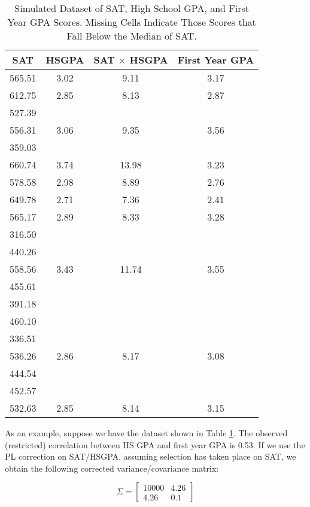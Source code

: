 \documentclass[man, babel,english]{apa}%
\begin{document}
\begin{table}[ht]
\caption{Simulated Dataset of SAT, High School GPA, and First Year GPA Scores. Missing Cells Indicate Those Scores that Fall Below the Median of SAT.} 
\label{tab:combs}
\begin{tabular}{cccc}
  \hline
SAT & HSGPA & SAT $\times$ HSGPA & First Year GPA \\ 
  \hline
565.51 & 3.02 & 9.11 & 3.17 \\ 
  612.75 & 2.85 & 8.13 & 2.87 \\ 
  527.39 &  &  &  \\ 
  556.31 & 3.06 & 9.35 & 3.56 \\ 
  359.03 &  &  &  \\ 
  660.74 & 3.74 & 13.98 & 3.23 \\ 
  578.58 & 2.98 & 8.89 & 2.76 \\ 
  649.78 & 2.71 & 7.36 & 2.41 \\ 
  565.17 & 2.89 & 8.33 & 3.28 \\ 
  316.50 &  &  &  \\ 
  440.26 &  &  &  \\ 
  558.56 & 3.43 & 11.74 & 3.55 \\ 
  455.61 &  &  &  \\ 
  391.18 &  &  &  \\ 
  460.10 &  &  &  \\ 
  336.51 &  &  &  \\ 
  536.26 & 2.86 & 8.17 & 3.08 \\ 
  444.54 &  &  &  \\ 
  452.57 &  &  &  \\ 
  532.63 & 2.85 & 8.14 & 3.15 \\ 
   \hline
\end{tabular}
\end{table}



As an example, suppose we have the dataset shown in Table \ref{tab:combs}. The observed (restricted) correlation between HS GPA and first year GPA is 0.53.  If we use the PL correction on SAT/HSGPA, assuming selection has taken place on SAT, we obtain the following corrected variance/covariance matrix:

 \[
   \Sigma=
  \left[ {\begin{array}{cc}
  10000 &  4.26 \\
	  4.26 &   0.1 
  \end{array} } \right]
\]
\end{document}

